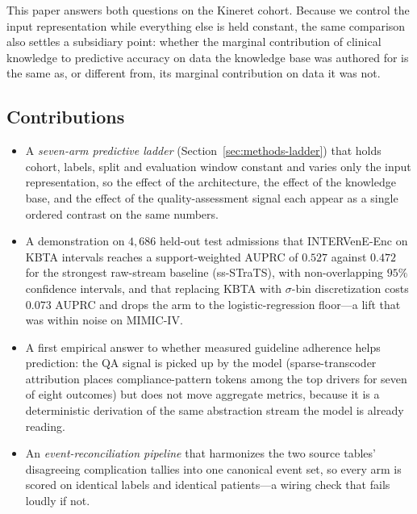 This paper answers both questions on the Kineret cohort. Because we control
the input representation while everything else is held constant, the same
comparison also settles a subsidiary point: whether the marginal
contribution of clinical knowledge to predictive accuracy on data the
knowledge base was authored for is the same as, or different from, its
marginal contribution on data it was not.

\subsection*{Contributions}

\begin{itemize}\setlength{\itemsep}{.15em}
\item A \emph{seven-arm predictive ladder}
      (Section~\ref{sec:methods-ladder}) that holds cohort, labels, split
      and evaluation window constant and varies only the input
      representation, so the effect of the architecture, the effect of the
      knowledge base, and the effect of the quality-assessment signal each
      appear as a single ordered contrast on the same numbers.
\item A demonstration on $4{,}686$ held-out test admissions that
      INTERVenE-Enc on KBTA intervals reaches a support-weighted AUPRC of
      $0.527$ against $0.472$ for the strongest raw-stream baseline
      (ss-STraTS), with non-overlapping $95\%$ confidence intervals, and
      that replacing KBTA with $\sigma$-bin discretization costs $0.073$
      AUPRC and drops the arm to the logistic-regression floor---a lift
      that was within noise on MIMIC-IV.
\item A first empirical answer to whether measured guideline adherence
      helps prediction: the QA signal is picked up by the model
      (sparse-transcoder attribution places compliance-pattern tokens
      among the top drivers for seven of eight outcomes) but does not
      move aggregate metrics, because it is a deterministic derivation of
      the same abstraction stream the model is already reading.
\item An \emph{event-reconciliation pipeline} that harmonizes the two
      source tables' disagreeing complication tallies into one canonical
      event set, so every arm is scored on identical labels and identical
      patients---a wiring check that fails loudly if not.
\end{itemize}


